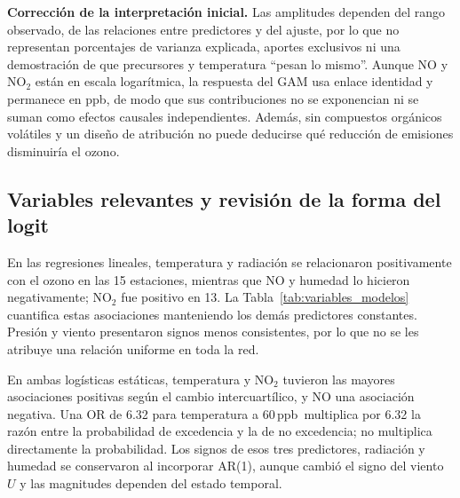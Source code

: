 \documentclass[11pt,letterpaper]{article}
\newcommand{\ppb}{\,ppb}
\newenvironment{cambio}{}{}
\begin{document}
\textbf{Corrección de la interpretación inicial.} Las amplitudes dependen del rango observado, de las relaciones entre predictores y del ajuste, por lo que no representan porcentajes de varianza explicada, aportes exclusivos ni una demostración de que precursores y temperatura ``pesan lo mismo''. Aunque NO y NO$_2$ están en escala logarítmica, la respuesta del GAM usa enlace identidad y permanece en ppb, de modo que sus contribuciones no se exponencian ni se suman como efectos causales independientes. Además, sin compuestos orgánicos volátiles y un diseño de atribución no puede deducirse qué reducción de emisiones disminuiría el ozono.
\clearpage


\begin{cambio}
\subsection{Variables relevantes y revisión de la forma del logit}
En las regresiones lineales, temperatura y radiación se relacionaron positivamente con el ozono en las 15 estaciones, mientras que NO y humedad lo hicieron negativamente; NO$_2$ fue positivo en 13. La Tabla~\ref{tab:variables_modelos} cuantifica estas asociaciones manteniendo los demás predictores constantes. Presión y viento presentaron signos menos consistentes, por lo que no se les atribuye una relación uniforme en toda la red.

En ambas logísticas estáticas, temperatura y NO$_2$ tuvieron las mayores asociaciones positivas según el cambio intercuartílico, y NO una asociación negativa. Una OR de 6.32 para temperatura a 60\ppb\ multiplica por 6.32 la razón entre la probabilidad de excedencia y la de no excedencia; no multiplica directamente la probabilidad. Los signos de esos tres predictores, radiación y humedad se conservaron al incorporar AR(1), aunque cambió el signo del viento $U$ y las magnitudes dependen del estado temporal.
\end{cambio}
\end{document}
